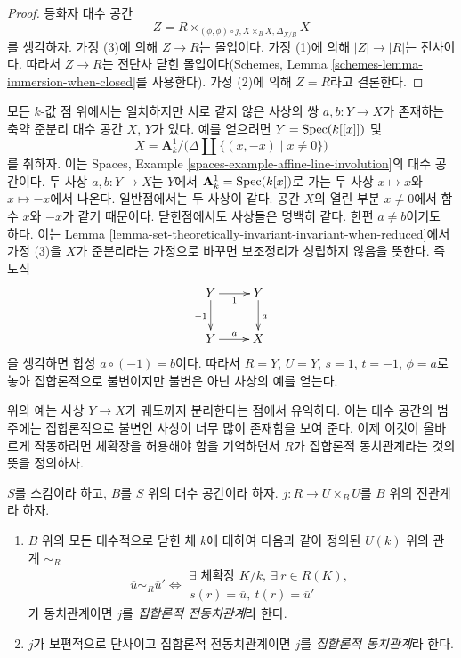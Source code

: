 \begin{proof}
등화자 대수 공간
$$
Z = R \times_{(\phi, \phi) \circ j, X \times_B X, \Delta_{X/B}} X
$$
를 생각하자. 가정 (3)에 의해 $Z \to R$는 몰입이다.
가정 (1)에 의해 $|Z| \to |R|$는 전사이다. 따라서
$Z \to R$는 전단사 닫힌 몰입이다(Schemes, Lemma
\ref{schemes-lemma-immersion-when-closed}를 사용한다).
가정 (2)에 의해 $Z = R$라고 결론한다.
\end{proof}

\begin{example}
\label{example-not-invariant}
모든 $k$-값 점 위에서는 일치하지만 서로 같지 않은 사상의 쌍
$a, b : Y \to X$가 존재하는 축약 준분리 대수 공간 $X$, $Y$가 있다.
예를 얻으려면 $Y = \mathop{\mathrm{Spec}}(k[[x]])$ 및
$$
X = \mathbf{A}^1_k \Big/ \big(\Delta \amalg \{(x, -x) \mid x \not = 0\}\big)
$$
를 취하자. 이는 Spaces, Example
\ref{spaces-example-affine-line-involution}의 대수 공간이다.
두 사상 $a, b : Y \to X$는 $Y$에서
$\mathbf{A}^1_k = \mathop{\mathrm{Spec}}(k[x])$로 가는 두 사상
$x \mapsto x$와 $x \mapsto -x$에서 나온다.
일반점에서는 두 사상이 같다. 공간 $X$의 열린 부분 $x \not = 0$에서
함수 $x$와 $-x$가 같기 때문이다. 닫힌점에서도 사상들은 명백히 같다.
한편 $a \not = b$이기도 하다. 이는 Lemma
\ref{lemma-set-theoretically-invariant-invariant-when-reduced}에서
가정 (3)을 $X$가 준분리라는 가정으로 바꾸면 보조정리가 성립하지
않음을 뜻한다. 즉 도식
$$
\xymatrix{
Y \ar[d]_{-1} \ar[r]_1 & Y \ar[d]^a \\
Y \ar[r]^a & X
}
$$
을 생각하면 합성 $a \circ (-1) = b$이다. 따라서 $R = Y$,
$U = Y$, $s = 1$, $t = -1$, $\phi = a$로 놓아 집합론적으로
불변이지만 불변은 아닌 사상의 예를 얻는다.
\end{example}

\noindent
위의 예는 사상 $Y \to X$가 궤도까지 분리한다는 점에서 유익하다.
이는 대수 공간의 범주에는 집합론적으로 불변인 사상이 너무 많이
존재함을 보여 준다. 이제 이것이 올바르게 작동하려면 체확장을
허용해야 함을 기억하면서 $R$가 집합론적 동치관계라는 것의 뜻을 정의하자.

\begin{definition}
\label{definition-set-theoretic-equivalence}
$S$를 스킴이라 하고, $B$를 $S$ 위의 대수 공간이라 하자.
$j : R \to U \times_B U$를 $B$ 위의 전관계라 하자.
\begin{enumerate}
\item $B$ 위의 모든 대수적으로 닫힌 체 $k$에 대하여 다음과 같이 정의된
$U(k)$ 위의 관계 $\sim_R$
$$
\overline{u} \sim_R \overline{u}'
\Leftrightarrow
\begin{matrix}
\exists\text{ 체확장 }K/k, \ \exists\ r \in R(K), \\
s(r) = \overline{u}, \ t(r) = \overline{u}'
\end{matrix}
$$
가 동치관계이면 $j$를 {\it 집합론적 전동치관계}라 한다.
\item $j$가 보편적으로 단사이고 집합론적 전동치관계이면
$j$를 {\it 집합론적 동치관계}라 한다.
\end{enumerate}
\end{definition}

